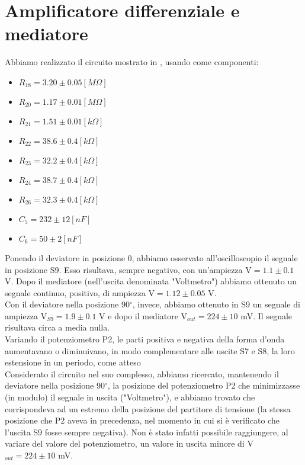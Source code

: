 \section{Amplificatore differenziale e mediatore}
Abbiamo realizzato il circuito mostrato in , usando come componenti:
\begin{itemize}
\item $R_{18}=3.20 \pm 0.05[M\Omega]$
\item $R_{20}=1.17 \pm 0.01[M\Omega]$
\item $R_{21}=1.51 \pm 0.01[k\Omega]$
\item $R_{22}=38.6 \pm 0.4[k\Omega]$
\item $R_{23}=32.2 \pm 0.4[k\Omega]$
\item $R_{24}=38.7 \pm 0.4[k\Omega]$
\item $R_{26}=32.3 \pm 0.4[k\Omega]$
\item $C_5=232 \pm 12[nF]$
\item $C_6=50 \pm 2[nF]$
\end{itemize}
Ponendo il deviatore in posizione 0, abbiamo osservato all'oscilloscopio il segnale in posizione S9. Esso risultava, sempre negativo, con un'ampiezza V$ = 1.1 \pm 0.1$ V. Dopo il mediatore (nell'uscita denominata "Voltmetro") abbiamo ottenuto un segnale continuo, positivo, di ampiezza V$ = 1.12 \pm 0.05$ V.\\
Con il deviatore nella posizione 90$^\circ$, invece, abbiamo ottenuto in S9 un segnale di ampiezza V$_{S9} = 1.9 \pm 0.1$ V e dopo il mediatore V$_{out} = 224 \pm 10$ mV. Il segnale risultava circa a media nulla.\\
 Variando il potenziometro P2, le parti positiva e negativa della forma d'onda aumentavano o diminuivano, in modo complementare alle uscite S7 e S8, la loro estensione in un periodo, come atteso\\
Considerato il circuito nel suo complesso, abbiamo ricercato, mantenendo il deviatore nella posizione 90$^\circ$, la posizione del potenziometro P2 che minimizzasse (in modulo) il segnale in uscita ("Voltmetro"), e abbiamo trovato che corrispondeva ad un estremo della posizione del partitore di tensione (la stessa posizione che P2 aveva in precedenza, nel momento in cui si è verificato che l'uscita S9 fosse sempre negativa). Non è stato infatti possibile raggiungere, al variare del valore del potenziometro, un valore in uscita minore di V$_{out} = 224 \pm 10$ mV. 

